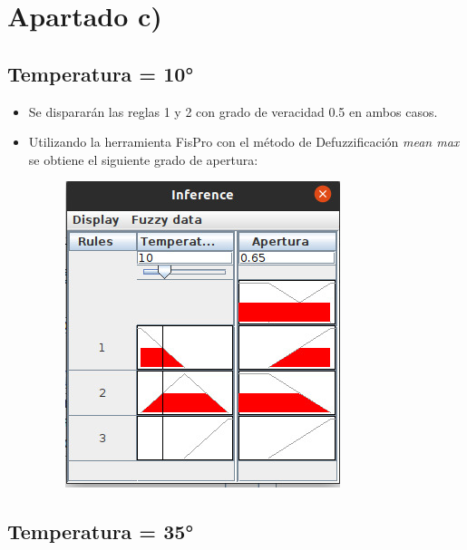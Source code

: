 \documentclass[11pt]{article}
\begin{document}
\section*{Apartado c)}

\subsection*{Temperatura = 10°}

\begin{itemize}
    \item Se dispararán las reglas 1 y 2 con grado de veracidad 0.5 en ambos casos.
    \item Utilizando la herramienta FisPro con el método de Defuzzificación \emph{mean max}
          se obtiene el siguiente grado de apertura:

          \begin{figure}[h!]
            \begin{center}
              \includegraphics[width=0.4\linewidth]{t10.jpeg}
            \end{center}
          \end{figure}
\end{itemize}

\subsection*{Temperatura = 35°}
\end{document}
